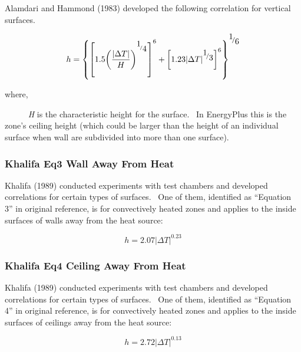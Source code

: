 Alamdari and Hammond (1983) developed the following correlation for vertical surfaces.

\begin{equation}
h = {\left\{ {{{\left[ {1.5{{\left( {\frac{{\left| {\Delta T} \right|}}{H}} \right)}^{^{{\raise0.7ex\hbox{1} \!\mathord{\left/ {\vphantom {1 4}}\right.}\!\lower0.7ex\hbox{4}}}}}} \right]}^6} + {{\left[ {1.23{{\left| {\Delta T} \right|}^{{\raise0.7ex\hbox{1} \!\mathord{\left/ {\vphantom {1 3}}\right.}\!\lower0.7ex\hbox{3}}}}} \right]}^6}} \right\}^{{\raise0.7ex\hbox{1} \!\mathord{\left/ {\vphantom {1 6}}\right.}\!\lower0.7ex\hbox{6}}}}
\end{equation}

where,

~~~~~ \emph{H} is the characteristic height for the surface.~ In EnergyPlus this is the zone's ceiling height (which could be larger than the height of an individual surface when wall are subdivided into more than one surface).

\subsubsection{Khalifa Eq3 Wall Away From Heat}\label{khalifa-eq3-wall-away-from-heat}

Khalifa (1989) conducted experiments with test chambers and developed correlations for certain types of surfaces.~ One of them, identified as ``Equation 3'' in original reference, is for convectively heated zones and applies to the inside surfaces of walls away from the heat source:

\begin{equation}
h = 2.07{\left| {\Delta T} \right|^{0.23}}
\end{equation}

\subsubsection{Khalifa Eq4 Ceiling Away From Heat}\label{khalifa-eq4-ceiling-away-from-heat}

Khalifa (1989) conducted experiments with test chambers and developed correlations for certain types of surfaces.~ One of them, identified as ``Equation 4'' in original reference, is for convectively heated zones and applies to the inside surfaces of ceilings away from the heat source:

\begin{equation}
h = 2.72{\left| {\Delta T} \right|^{0.13}}
\end{equation}

